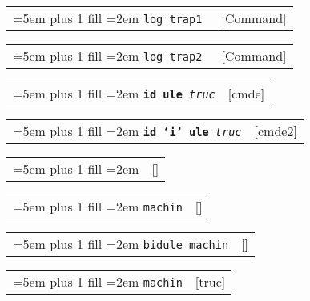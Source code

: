 \documentclass{book}
\begin{document}
%

\noindent\begin{tabularx}{\linewidth}{@{}Xr}
\rightskip=5em plus 1 fill
\hangindent=2em
\texttt{log trap1 \EmbracOn{}\textnormal{\textsl{}}\EmbracOff{}}& [Command]
\end{tabularx}

%

\noindent\begin{tabularx}{\linewidth}{@{}Xr}
\rightskip=5em plus 1 fill
\hangindent=2em
\texttt{log trap2 \EmbracOn{}\textnormal{\textsl{}}\EmbracOff{}}& [Command]
\end{tabularx}

%

\noindent\begin{tabularx}{\linewidth}{@{}Xr}
\rightskip=5em plus 1 fill
\hangindent=2em
\texttt{\textbf{id ule} \EmbracOn{}\textnormal{\textsl{truc}}\EmbracOff{}}& [cmde]
\end{tabularx}

%

\noindent\begin{tabularx}{\linewidth}{@{}Xr}
\rightskip=5em plus 1 fill
\hangindent=2em
\texttt{\textbf{id `\texttt{i}'\ ule} \EmbracOn{}\textnormal{\textsl{truc}}\EmbracOff{}}& [cmde2]
\end{tabularx}

%

\noindent\begin{tabularx}{\linewidth}{@{}Xr}
\rightskip=5em plus 1 fill
\hangindent=2em
\texttt{}& []
\end{tabularx}


\noindent\begin{tabularx}{\linewidth}{@{}Xr}
\rightskip=5em plus 1 fill
\hangindent=2em
\texttt{machin}& []
\end{tabularx}

%

\noindent\begin{tabularx}{\linewidth}{@{}Xr}
\rightskip=5em plus 1 fill
\hangindent=2em
\texttt{bidule machin}& []
\end{tabularx}

%

\noindent\begin{tabularx}{\linewidth}{@{}Xr}
\rightskip=5em plus 1 fill
\hangindent=2em
\texttt{machin}& [truc]
\end{tabularx}
\end{document}
